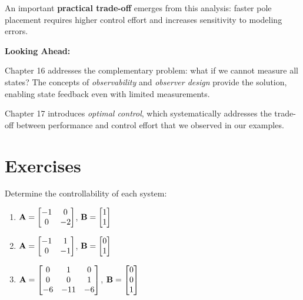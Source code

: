 An important \textbf{practical trade-off} emerges from this analysis: faster pole placement requires higher control effort and increases sensitivity to modeling errors.

\textbf{Looking Ahead:}

Chapter 16 addresses the complementary problem: what if we cannot measure all states? The concepts of \textit{observability} and \textit{observer design} provide the solution, enabling state feedback even with limited measurements.

Chapter 17 introduces \textit{optimal control}, which systematically addresses the trade-off between performance and control effort that we observed in our examples.

\newpage
\section{Exercises}

\begin{exercise}
Determine the controllability of each system:
\begin{enumerate}
\item $\mathbf{A} = \begin{bmatrix} -1 & 0 \\ 0 & -2 \end{bmatrix}$, $\mathbf{B} = \begin{bmatrix} 1 \\ 1 \end{bmatrix}$

\item $\mathbf{A} = \begin{bmatrix} -1 & 1 \\ 0 & -1 \end{bmatrix}$, $\mathbf{B} = \begin{bmatrix} 0 \\ 1 \end{bmatrix}$

\item $\mathbf{A} = \begin{bmatrix} 0 & 1 & 0 \\ 0 & 0 & 1 \\ -6 & -11 & -6 \end{bmatrix}$, $\mathbf{B} = \begin{bmatrix} 0 \\ 0 \\ 1 \end{bmatrix}$
\end{enumerate}
\end{exercise}

